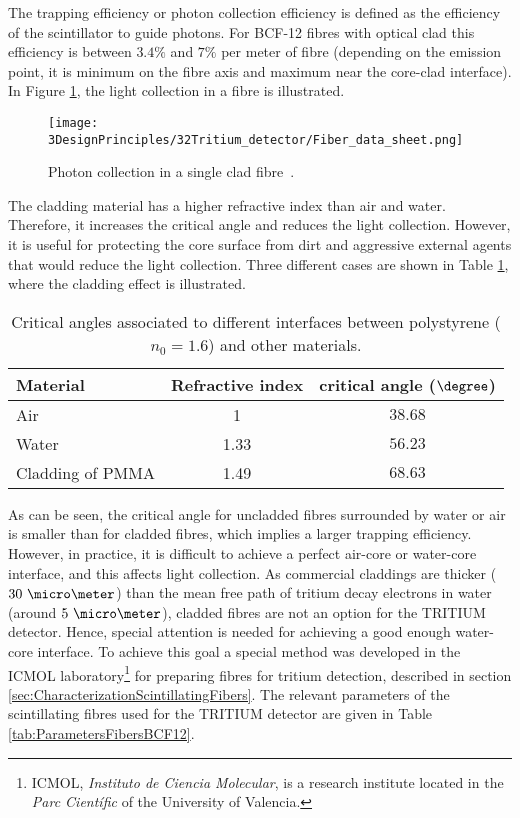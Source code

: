 The trapping efficiency or photon collection efficiency is defined as the efficiency of the scintillator to guide photons. For BCF-12 fibres with optical clad this efficiency is between $3.4\%$ and $7\%$ per meter of fibre (depending on the emission point, it is minimum on the fibre axis and maximum near the core-clad interface). In Figure \ref{fig:Fiber_physic}, the light collection in a fibre is illustrated.


\begin{figure}[htbp]
\centering
\texttt{[image: 3DesignPrinciples/32Tritium\_detector/Fiber\_data\_sheet.png]}
\caption{Photon collection in a single clad fibre\label{fig:Fiber_physic}~\cite{DataSheetBCF12Fiber}.}
\end{figure}
The cladding material has a higher refractive index than air and water. Therefore, it increases the critical angle and reduces the light collection. However, it is useful for protecting the core surface from dirt and aggressive external agents that would reduce the light collection. Three different cases are shown in Table \ref{tab:CriticalAngles}, where the cladding effect is illustrated.
\begin{table}[h]
\centering{}%
\begin{tabular}{lcc}
\toprule 
Material & Refractive index & critical angle ($\degree$) \tabularnewline
\midrule
\midrule 
Air & 1 & $38.68$ \tabularnewline
Water & 1.33 & $56.23$ \tabularnewline
Cladding of PMMA & 1.49 & $68.63$ \tabularnewline
\bottomrule
\end{tabular}
\caption{Critical angles associated to different interfaces between polystyrene ($n_0=1.6$) and other materials.}
\label{tab:CriticalAngles}
\end{table}
As can be seen, the critical angle for uncladded fibres surrounded by water or air is smaller than for cladded fibres, which implies a larger trapping efficiency. However, in practice, it is difficult to achieve a perfect air-core or water-core interface, and this affects light collection. As commercial claddings are thicker ($30~\micro \meter$) than the mean free path of tritium decay electrons in water (around $5~\micro\meter$), cladded fibres are not an option for the TRITIUM detector. Hence, special attention is needed for achieving a good enough water-core interface. To achieve this goal a special method was developed in the ICMOL laboratory\footnote{ICMOL, \textit{Instituto de Ciencia Molecular}, is a research institute located in the \textit{Parc Científic} of the University of Valencia.} for preparing fibres for tritium detection, described in section \ref{sec:CharacterizationScintillatingFibers}. The relevant parameters of the scintillating fibres used for the TRITIUM detector are given in Table \ref{tab:ParametersFibersBCF12}.

